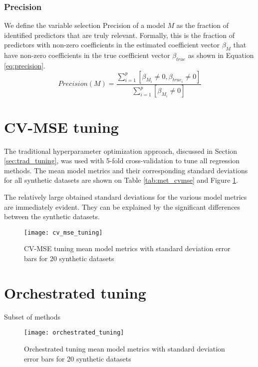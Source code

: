 \subsubsection{Precision}
We define the variable selection Precision of a model $M$ as the fraction of identified predictors that are truly relevant. Formally, this is the fraction of predictors with non-zero coefficients in the estimated coefficient vector $\beta_M$ that have non-zero coefficients in the true coefficient vector $\beta_{true}$ as shown in Equation \ref{eq:precision}. 
\begin{equation} \label{eq:precision}
Precision(M) = \frac{\sum_{i=1}^{p}[\beta_{M_i} \ne 0, \beta_{true_i} \ne 0]}{\sum_{i=1}^{p}[\beta_{M_i} \ne 0]}
\end{equation}

\section{CV-MSE tuning}
The traditional hyperparameter optimization approach, discussed in Section \ref{sec:trad_tuning}, was used with 5-fold cross-validation to tune all regression methods. The mean model metrics and their corresponding standard deviations for all synthetic datasets are shown on Table \ref{tab:met_cvmse} and Figure \ref{fig:met_cvmse}.

The relatively large obtained standard deviations for the various model metrics are immediately evident. They can be explained by the significant differences between the synthetic datasets.



\begin{figure}[H]
	\centering
	\texttt{[image: cv\_mse\_tuning]}
	\caption{CV-MSE tuning mean model metrics with standard deviation error bars for 20 synthetic datasets}
	\label{fig:met_cvmse}
\end{figure}

\section{Orchestrated tuning}
Subset of methods


\begin{figure}[H]
	\centering
	\texttt{[image: orchestrated\_tuning]}
	\caption{Orchestrated tuning mean model metrics with standard deviation error bars for 20 synthetic datasets}
	\label{fig:met_orchestrated}
\end{figure}

